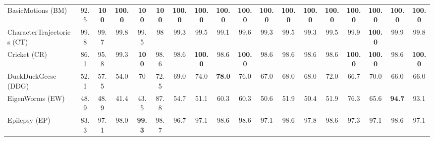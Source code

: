 \documentclass[journal]{IEEEtran}
\begin{document}
\begin{table*}[!t]
\begin{tabular}{l|c|c|c|c|c|cccc|cccc|cccc|}
BasicMotions (BM) & 92.5  & \textbf{100} & \textbf{100.0} & \textbf{100} & \textbf{100} & \textcolor[rgb]{ 1,  0,  0}{\textbf{100.0}} & \textbf{100.0} & \textbf{100.0} & \textbf{100.0} & \textcolor[rgb]{ 1,  0,  0}{\textbf{100.0}} & \textbf{100.0} & \textbf{100.0} & \textbf{100.0} & \textcolor[rgb]{ 1,  0,  0}{\textbf{100.0}} & \textbf{100.0} & \textbf{100.0} & \textbf{100.0} \\
CharacterTrajectories (CT) & 99.8  & 99.7  & 99.8  & 99.5  & 98    & \textcolor[rgb]{ 1,  0,  0}{99.3} & \textcolor[rgb]{ .188,  .329,  .588}{99.5} & 99.1  & \textcolor[rgb]{ .188,  .329,  .588}{99.6} & \textcolor[rgb]{ 1,  0,  0}{99.3} & \textcolor[rgb]{ .776,  .349,  .067}{99.5} & 99.3  & \textcolor[rgb]{ .776,  .349,  .067}{99.5} & \textcolor[rgb]{ 1,  0,  0}{99.9} & \textcolor[rgb]{ .439,  .678,  .278}{\textbf{100.0}} & \textcolor[rgb]{ .439,  .678,  .278}{99.9} & 99.8 \\
Cricket (CR) & 86.1  & 95.8  & 99.3  & \textbf{100} & 98.6  & \textcolor[rgb]{ 1,  0,  0}{98.6} & \textcolor[rgb]{ .188,  .329,  .588}{\textbf{100.0}} & \textcolor[rgb]{ .188,  .329,  .588}{98.6} & \textcolor[rgb]{ .188,  .329,  .588}{\textbf{100.0}} & \textcolor[rgb]{ 1,  0,  0}{98.6} & \textcolor[rgb]{ .776,  .349,  .067}{98.6} & \textcolor[rgb]{ .776,  .349,  .067}{98.6} & \textcolor[rgb]{ .776,  .349,  .067}{98.6} & \textcolor[rgb]{ 1,  0,  0}{\textbf{100.0}} & \textbf{100.0} & 98.6  & \textbf{100.0} \\
DuckDuckGeese (DDG) & 52.1  & 57.5  & 54.0  & 70    & 72.5  & \textcolor[rgb]{ 1,  0,  0}{69.0} & \textcolor[rgb]{ .188,  .329,  .588}{74.0} & \textcolor[rgb]{ .188,  .329,  .588}{\textbf{78.0}} & \textcolor[rgb]{ .188,  .329,  .588}{76.0} & \textcolor[rgb]{ 1,  0,  0}{67.0} & \textcolor[rgb]{ .776,  .349,  .067}{68.0} & \textcolor[rgb]{ .776,  .349,  .067}{68.0} & \textcolor[rgb]{ .776,  .349,  .067}{72.0} & \textcolor[rgb]{ 1,  0,  0}{66.7} & \textcolor[rgb]{ .439,  .678,  .278}{70.0} & 66.0  & 66.0 \\
EigenWorms (EW) & 48.9  & 48.9  & 41.4  & 43.5  & 87.8  & \textcolor[rgb]{ 1,  0,  0}{54.7} & 51.1  & \textcolor[rgb]{ .188,  .329,  .588}{60.3} & \textcolor[rgb]{ .188,  .329,  .588}{60.3} & \textcolor[rgb]{ 1,  0,  0}{50.6} & \textcolor[rgb]{ .776,  .349,  .067}{51.9} & 50.4  & \textcolor[rgb]{ .776,  .349,  .067}{51.9} & \textcolor[rgb]{ 1,  0,  0}{76.3} & 65.6  & \textcolor[rgb]{ .439,  .678,  .278}{\textbf{94.7}} & \textcolor[rgb]{ .439,  .678,  .278}{93.1} \\
Epilepsy (EP) & 83.3  & 97.1  & 98.0  & \textbf{99.3} & 98.7  & \textcolor[rgb]{ 1,  0,  0}{96.7} & \textcolor[rgb]{ .188,  .329,  .588}{97.1} & \textcolor[rgb]{ .188,  .329,  .588}{98.6} & \textcolor[rgb]{ .188,  .329,  .588}{98.6} & \textcolor[rgb]{ 1,  0,  0}{97.1} & \textcolor[rgb]{ .776,  .349,  .067}{98.6} & \textcolor[rgb]{ .776,  .349,  .067}{97.8} & \textcolor[rgb]{ .776,  .349,  .067}{98.6} & \textcolor[rgb]{ 1,  0,  0}{97.3} & 97.1  & \textcolor[rgb]{ .439,  .678,  .278}{98.6} & 97.1 \\

\end{tabular}
\end{table*}
\end{document}
